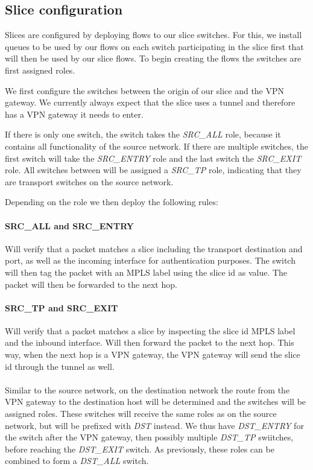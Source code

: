\subsection{Slice configuration}
Slices are configured by deploying flows to our slice switches. For this, we install queues to be used by our flows on each switch participating in the slice first that will then be used by our slice flows. To begin creating the flows the switches are first assigned roles.

We first configure the switches between the origin of our slice and the VPN gateway. We currently always expect that the slice uses a tunnel and therefore has a VPN gateway it needs to enter.

If there is only one switch, the switch takes the \textit{SRC\_ALL} role, because it contains all functionality of the source network. If there are multiple switches, the first switch will take the \textit{SRC\_ENTRY} role and the last switch the \textit{SRC\_EXIT} role. All switches between will be assigned a \textit{SRC\_TP} role, indicating that they are transport switches on the source network.

Depending on the role we then deploy the following rules:

\paragraph{SRC\_ALL and SRC\_ENTRY} Will verify that a packet matches a slice including the transport destination and port, as well as the incoming interface for authentication purposes. The switch will then tag the packet with an MPLS label using the slice id as value. The packet will then be forwarded to the next hop.

\paragraph{SRC\_TP and SRC\_EXIT} Will verify that a packet matches a slice by inspecting the slice id MPLS label and the inbound interface. Will then forward the packet to the next hop. This way, when the next hop is a VPN gateway, the VPN gateway will send the slice id through the tunnel as well.

\paragraph{} Similar to the source network, on the destination network the route from the VPN gateway to the destination host will be determined and the switches will be assigned roles. These switches will receive the same roles as on the source network, but will be prefixed with \textit{DST} instead. We thus have \textit{DST\_ENTRY} for the switch after the VPN gateway, then possibly multiple \textit{DST\_TP} swiitches, before reaching the \textit{DST\_EXIT} switch. As previously, these roles can be combined to form a \textit{DST\_ALL} switch.

